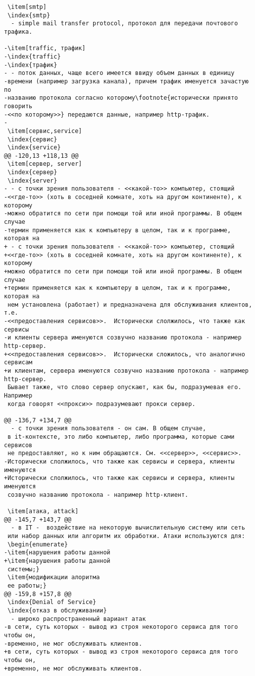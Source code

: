 \begin{verbatim}
 \item[smtp]
 \index{smtp}
  - simple mail transfer protocol, протокол для передачи почтового трафика.

-\item[traffic, трафик]
-\index{traffic}
-\index{трафик}
- - поток данных, чаще всего имеется ввиду объем данных в единицу
-времени (например загрузка канала), причем трафик именуется зачастую по
-названию протокола согласно которому\footnote{исторически принято говорить
-<<по которому>>} передаются данные, например http-трафик.
-
 \item[сервис,service]
 \index{сервис}
 \index{service}
@@ -120,13 +118,13 @@
 \item[сервер, server]
 \index{сервер}
 \index{server}
- - с точки зрения пользователя - <<какой-то>> компьютер, стоящий
-<<где-то>> (хоть в соседней комнате, хоть на другом континенте), к которому
-можно обратится по сети при помощи той или иной программы. В общем случае
-термин применяется как к компьютеру в целом, так и к программе, которая на
+ - с точки зрения пользователя - <<какой-то>> компьютер, стоящий
+<<где-то>> (хоть в соседней комнате, хоть на другом континенте), к которому
+можно обратится по сети при помощи той или иной программы. В общем случае
+термин применяется как к компьютеру в целом, так и к программе, которая на
 нем установлена (работает) и предназначена для обслуживания клиентов, т.е.
-<<предоставления сервисов>>.  Исторически слолжилось, что также как сервисы
-и клиенты сервера именуются созвучно названию протокола - например http-сервер.
+<<предоставления сервисов>>.  Исторически сложилось, что аналогично сервисам
+и клиентам, сервера именуются созвучно названию протокола - например http-сервер.
 Бывает также, что слово сервер опускают, как бы, подразумевая его. Например
 когда говорят <<прокси>> подразумевают прокси сервер.

@@ -136,7 +134,7 @@
  - с точки зрения пользователя - он сам. В общем случае,
 в it-контексте, это либо компьютер, либо программа, которые сами сервисов
 не предоставляют, но к ним обращаются. См. <<сервер>>, <<сервис>>.
-Исторически слолжилось, что также как сервисы и сервера, клиенты именуются
+Исторически слолжилось, что также как сервисы и сервера, клиенты именуются
 созвучно названию протокола - например http-клиент.

 \item[атака, attack]
@@ -145,7 +143,7 @@
  - в IT -  воздействие на некоторую вычислительную систему или сеть
 или набор данных или алгоритм их обработки. Атаки используются для:
 \begin{enumerate}
-\item{нарушения работы данной
+\item{нарушения работы данной
 системы;}
 \item{модификации алоритма
 ее работы;}
@@ -159,8 +157,8 @@
 \index{Denial of Service}
 \index{отказ в обслуживании}
  - широко распространенный вариант атак
-в сети, суть которых - вывод из строя некоторого сервиса для того чтобы он,
-временно, не мог обслуживать клиентов.
+в сети, суть которых - вывод из строя некоторого сервиса для того чтобы он,
+временно, не мог обслуживать клиентов.



\end{verbatim}
